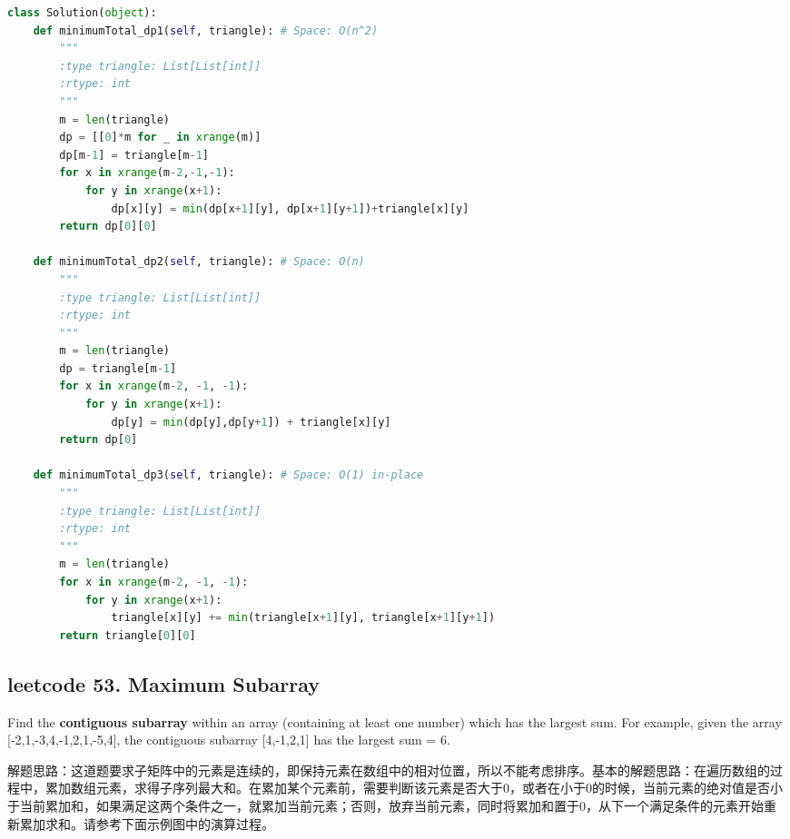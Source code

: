 \documentclass[a4paper,10pt]{article}
\begin{document}
\begin{lstlisting}[language=Python, caption=Problem120. Triangle]
class Solution(object):
    def minimumTotal_dp1(self, triangle): # Space: O(n^2)
        """
        :type triangle: List[List[int]]
        :rtype: int
        """
        m = len(triangle)
        dp = [[0]*m for _ in xrange(m)]
        dp[m-1] = triangle[m-1]
        for x in xrange(m-2,-1,-1):
            for y in xrange(x+1):
                dp[x][y] = min(dp[x+1][y], dp[x+1][y+1])+triangle[x][y]
        return dp[0][0]
        
    def minimumTotal_dp2(self, triangle): # Space: O(n)
        """
        :type triangle: List[List[int]]
        :rtype: int
        """
        m = len(triangle)
        dp = triangle[m-1]
        for x in xrange(m-2, -1, -1):
            for y in xrange(x+1):
                dp[y] = min(dp[y],dp[y+1]) + triangle[x][y]
        return dp[0]
    
    def minimumTotal_dp3(self, triangle): # Space: O(1) in-place
        """
        :type triangle: List[List[int]]
        :rtype: int
        """
        m = len(triangle)
        for x in xrange(m-2, -1, -1):
            for y in xrange(x+1):
                triangle[x][y] += min(triangle[x+1][y], triangle[x+1][y+1])
        return triangle[0][0]
\end{lstlisting}




\subsection{leetcode 53. Maximum Subarray}
Find the \textbf{contiguous subarray} within an array (containing at least one number) which has the largest sum. For example, given the array [-2,1,-3,4,-1,2,1,-5,4], the contiguous subarray [4,-1,2,1] has the largest sum = 6. \\

\begin{CJK*}{UTF8}{gbsn}
\noindent 解题思路：这道题要求子矩阵中的元素是连续的，即保持元素在数组中的相对位置，所以不能考虑排序。基本的解题思路：在遍历数组的过程中，累加数组元素，求得子序列最大和。在累加某个元素前，需要判断该元素是否大于0，或者在小于0的时候，当前元素的绝对值是否小于当前累加和，如果满足这两个条件之一，就累加当前元素；否则，放弃当前元素，同时将累加和置于0，从下一个满足条件的元素开始重新累加求和。请参考下面示例图中的演算过程。
\end{CJK*}
\end{document}
